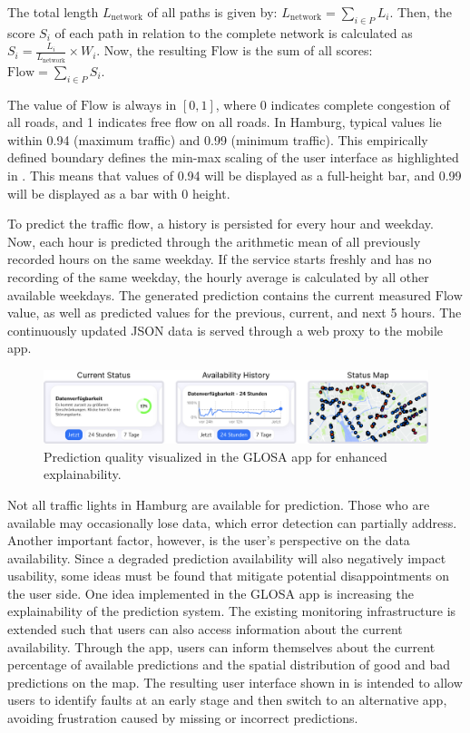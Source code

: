 The total length $L_\text{network}$ of all paths is given by: $L_\text{network} = \sum_{i \in P} L_i$. Then, the score $S_i$ of each path in relation to the complete network is calculated as $S_i = \frac{L_i}{L_\text{network}} \times W_i$. Now, the resulting $\text{Flow}$ is the sum of all scores: $\text{Flow} = \sum_{i \in P} S_i$. 

The value of $\text{Flow}$ is always in $[0, 1]$, where 0 indicates complete congestion of all roads, and 1 indicates free flow on all roads. In Hamburg, typical values lie within 0.94 (maximum traffic) and 0.99 (minimum traffic). This empirically defined boundary defines the min-max scaling of the user interface as highlighted in . This means that values of 0.94 will be displayed as a full-height bar, and 0.99 will be displayed as a bar with 0 height. 

To predict the traffic flow, a history is persisted for every hour and weekday. Now, each hour is predicted through the arithmetic mean of all previously recorded hours on the same weekday. If the service starts freshly and has no recording of the same weekday, the hourly average is calculated by all other available weekdays. The generated prediction contains the current measured $\text{Flow}$ value, as well as predicted values for the previous, current, and next 5 hours. The continuously updated JSON data is served through a web proxy to the mobile app.


\begin{figure}[htbp]
\centering
\includegraphics[width=\linewidth]{images/home-view-prediction-quality.png}
\caption{Prediction quality visualized in the GLOSA app for enhanced explainability.}
\label{fig:home-view-prediction-quality}
\end{figure}

Not all traffic lights in Hamburg are available for prediction. Those who are available may occasionally lose data, which error detection can partially address. Another important factor, however, is the user's perspective on the data availability. Since a degraded prediction availability will also negatively impact usability, some ideas must be found that mitigate potential disappointments on the user side. One idea implemented in the GLOSA app is increasing the explainability of the prediction system. The existing monitoring infrastructure is extended such that users can also access information about the current availability. Through the app, users can inform themselves about the current percentage of available predictions and the spatial distribution of good and bad predictions on the map. The resulting user interface shown in  is intended to allow users to identify faults at an early stage and then switch to an alternative app, avoiding frustration caused by missing or incorrect predictions.

